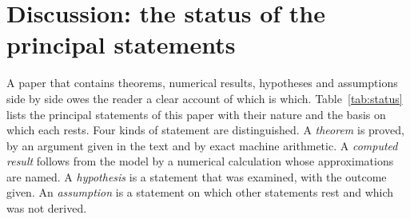 
\section{Discussion: the status of the principal statements}
\label{sec:status}

A paper that contains theorems, numerical results, hypotheses and assumptions side by side owes the
reader a clear account of which is which. Table~\ref{tab:status} lists the principal statements of
this paper with their nature and the basis on which each rests. Four kinds of statement are
distinguished. A \emph{theorem} is proved, by an argument given in the text and by exact machine
arithmetic. A \emph{computed result} follows from the model by a numerical calculation whose
approximations are named. A \emph{hypothesis} is a statement that was examined, with the outcome
given. An \emph{assumption} is a statement on which other statements rest and which was not derived.

